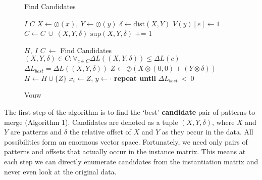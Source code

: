 \documentclass{llncs}
\begin{document}
\begin{figure*}[t]
\vspace{-\baselineskip}
\begin{minipage}[t]{.45\textwidth}
	\begin{algorithm}[H]
	\caption{Find Candidates}
	\begin{algorithmic}[1]
	\Require $I$
	\Ensure $C$
			\State $X \gets \oslash(x), \ Y \gets \oslash(y)$
			\State $\delta \gets \mathrm{dist}(X,Y)$
				\State $V(y)[e] \gets 1$
			\EndIf
			\State $C \gets C \ \cup \ (X,Y,\delta)$
			\State $\mathrm{sup}(X,Y,\delta)$ += 1
		\EndFor
	\EndFor
	\end{algorithmic}
	\end{algorithm}%
\end{minipage}%
\begin{minipage}[t]{.55\textwidth}
	\begin{algorithm}[H]
	\caption{Vouw}
	\label{alg:vouw}
	\begin{algorithmic}[1]
	\Require $H,\ I$
		\State $C \ \gets$ Find Candidates
		\State $(X,Y,\delta) \in C : \forall_{c \in C} \Delta L((X,Y,\delta)) \leq \Delta L(c)$
	\State $\Delta L_{best} = \Delta L((X,Y,\delta))$
		\State $Z \gets \oslash(X\otimes(0,0) + (Y\otimes\delta))$
		\State $H \gets H \cup \{Z\}$
				\State $x_i \gets Z$,  $y \gets \cdot$
			\EndFor
		\EndFor
	\EndIf
	\State \textbf{repeat until} $\Delta L_{best} \ < \ 0$
	\end{algorithmic}%
	\vspace{-1.75pt}
	\end{algorithm}
\end{minipage}
\end{figure*}

The first step of the algorithm is to find the `best' \textbf{candidate} pair of patterns to merge (Algorithm 1). Candidates are denoted as a tuple $(X,Y,\delta)$, where $X$ and $Y$ are patterns and $\delta$ the relative offset of $X$ and $Y$ as they occur in the data. All possibilities form an enormous vector space. Fortunately, we need only pairs of patterns and offsets that actually occur in the instance matrix. This means at each step we can directly enumerate candidates from the instantiation matrix and never even look at the original data.  
\end{document}
